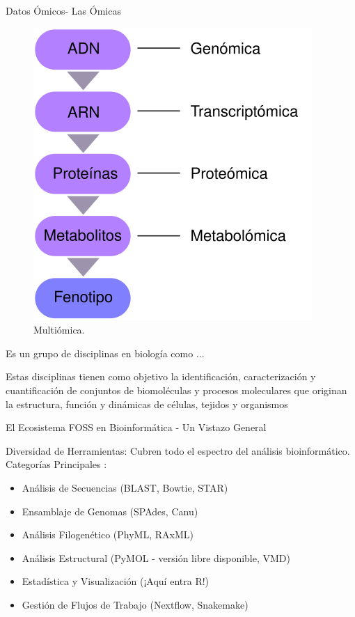 \documentclass[11pt]{beamer}
\begin{document}
	\begin{frame}{Datos Ómicos- Las Ómicas }
		\begin{figure} %
    		\centering %
    		\includegraphics[width=0.7\linewidth]{Omics.png} %
    		\caption{Multiómica.} %
    		\label{fig:Multiómica} %
		\end{figure}
Es un grupo de disciplinas 
en biología como ...

Estas disciplinas tienen como objetivo la identificación, caracterización y cuantificación de conjuntos de biomoléculas y procesos moleculares que originan la estructura, función y dinámicas de células, tejidos y organismos
	\end{frame}


	\begin{frame}{El Ecosistema FOSS en Bioinformática - Un Vistazo General}

Diversidad de Herramientas: Cubren todo el espectro del análisis bioinformático.
Categorías Principales :
		 \begin{itemize}
			\item Análisis de Secuencias (BLAST, Bowtie, STAR)
			\item Ensamblaje de Genomas (SPAdes, Canu)
			\item Análisis Filogenético (PhyML, RAxML)
			\item Análisis Estructural (PyMOL - versión libre disponible, VMD)
			\item Estadística y Visualización (¡Aquí entra R!)
			\item Gestión de Flujos de Trabajo (Nextflow, Snakemake)
 		\end{itemize}
	\end{frame}
	
\end{document}
